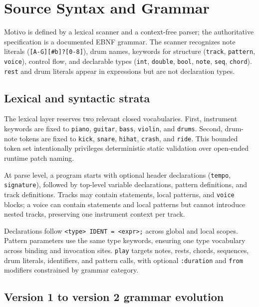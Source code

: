 \section{Source Syntax and Grammar}\label{sec:source-grammar}

Motivo is defined by a lexical scanner and a context-free parser; the authoritative specification is a documented EBNF
grammar.
The scanner recognizes note literals (\verb|[A-G][#b]?[0-8]|), drum names, keywords for structure
(\texttt{track}, \texttt{pattern}, \texttt{voice}), control flow, and declarable types (\texttt{int},
\texttt{double}, \texttt{bool}, \texttt{note}, \texttt{seq}, \texttt{chord}).
\texttt{rest} and drum literals appear in expressions but are not declaration types.

\subsection{Lexical and syntactic strata}

The lexical layer reserves two relevant closed vocabularies.
First, instrument keywords are fixed to \texttt{piano}, \texttt{guitar}, \texttt{bass}, \texttt{violin}, and
\texttt{drums}.
Second, drum-note tokens are fixed to \texttt{kick}, \texttt{snare}, \texttt{hihat}, \texttt{crash}, and
\texttt{ride}.
This bounded token set intentionally privileges deterministic static validation over open-ended runtime patch naming.

At parse level, a program starts with optional header declarations (\texttt{tempo}, \texttt{signature}), followed by
top-level variable declarations, pattern definitions, and track definitions.
Tracks may contain statements, local patterns, and \texttt{voice} blocks; a voice can contain statements and local
patterns but cannot introduce nested tracks, preserving one instrument context per track.

Declarations follow \texttt{<type> IDENT = <expr>;} across global and local scopes.
Pattern parameters use the same type keywords, ensuring one type vocabulary across binding and invocation sites.
\texttt{play} targets notes, rests, chords, sequences, drum literals, identifiers, and pattern calls, with optional
\texttt{:duration} and \texttt{from} modifiers constrained by grammar category.

\subsection{Version 1 to version 2 grammar evolution}\label{detail-subsec:v1-v2-grammar-evolution}

